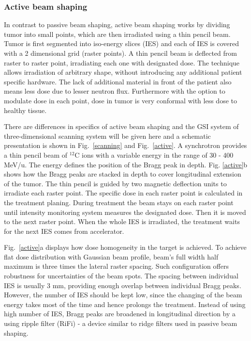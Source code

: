\subsubsection{Active beam shaping}
\label{Sec::Active}

In contrast to passive beam shaping, active beam shaping works by dividing tumor into small points, which are then irradiated using a thin pencil beam. Tumor is first segmented into iso-energy slices (IES) and each of IES
is covered with a 2 dimensional grid (raster points). A thin pencil beam is deflected from raster to raster point, irradiating each one with designated dose. The technique allows irradiation of arbitrary shape, without introducing any additional patient specific 
hardware. The lack of additional material in front of the patient also means less dose due to lesser neutron flux. Furthermore with the option to modulate dose in each point, dose in tumor is very conformal with less dose to healthy tissue.

There are differences in specifics of active beam shaping and the GSI system of three-dimensional scanning system will be given here \cite{Haberer1993,Kraft2000,Schardt2010} and a schematic presentation is shown in Fig.~\ref{scanning} and Fig.~\ref{active}.
A synchrotron provides a thin pencil beam of $^{12}$C ions with a variable energy in the range of 30 - 400 MeV/u. The energy defines the position of the Bragg peak in depth. Fig. \ref{active}b shows how the Bragg peaks are stacked in depth to cover longitudinal extension of the tumor.
The thin pencil is guided by two magnetic deflection units to irradiate each raster point. The specific dose in each raster point is calculated in the treatment planing.
During treatment the beam stays on each raster point until intensity monitoring system measures the designated dose. Then it is moved to the next raster point. When the whole IES is irradiated, the treatment waits for the next IES comes from accelerator.

Fig.~\ref{active}a displays how dose homogeneity in the target is achieved. To achieve flat dose distribution with Gaussian beam profile, beam's full width half maximum is three times the lateral raster spacing. Such configuration offers robustness for uncertainties of the beam spots.
The spacing between individual IES is usually 3 mm, providing enough overlap between individual Bragg peaks. However, the number of IES should be kept low, since the changing of the beam energy takes most of the time and hence prolongs the treatment. Instead of using high number of
 IES, Bragg peaks are broadened in longitudinal direction by a using ripple filter (RiFi) - a device similar to ridge filters used in passive beam shaping. 

